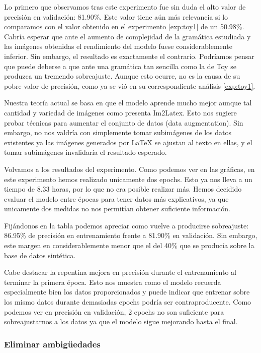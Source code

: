 \documentclass[a4paper, 20pt, dvipsnames]{article}
\begin{document}
Lo primero que observamos tras este experimento fue sin duda el alto valor de precisión
en validación: 81.90\%. Este valor tiene aún más relevancia si lo comparamos con el valor
obtenido en el experimento \ref{exp:toy1} de un 50.98\%. Cabría esperar que ante el aumento
de complejidad de la gramática estudiada y las imágenes obtenidas el rendimiento del
modelo fuese considerablemente inferior. Sin embargo, el resultado es exactamente el
contrario. Podríamos pensar que puede deberse a que ante una gramática tan sencilla
como la de Toy se produzca un tremendo sobreajuste. Aunque esto ocurre, no es la causa
de su pobre valor de precisión, como ya se vió en su correspondiente análisis \ref{exp:toy1}.

Nuestra teoría actual se basa en que el modelo aprende mucho mejor aunque tal cantidad
y variedad de imágenes como presenta Im2Latex. Esto nos sugiere probar técnicas para
aumentar el conjunto de datos (data augmentation). Sin embargo, no nos valdría con
simplemente tomar subimágenes de los datos existentes ya las imágenes generados por
\LaTeX{} se ajustan al texto en ellas, y el tomar subimágenes invalidaría el resultado
esperado.

Volvamos a los resultados del experimento. Como podemos ver en las gráficas, en este
experimento hemos realizado unicamente dos epochs. Esto ya nos lleva a un tiempo de
8.33 horas, por lo que no era posible realizar más. Hemos decidido evaluar el modelo
entre épocas para tener datos más explicativos, ya que unicamente dos medidas no nos
permitían obtener suficiente información.

Fijándonos en la tabla podemos apreciar como vuelve a producirse sobreajuste: 86.95\%
de precisión en entrenamiento frente a 81.90\% en validación. Sin embargo, este margen
en considerablemente menor que el del 40\% que se producía sobre la base de datos sintética.

Cabe destacar la repentina mejora en precisión durante el entrenamiento al terminar
la primera época. Esto nos muestra como el modelo recuerda especialmente bien los
datos proporcionados y puede indicar que entrenar sobre los mismo datos durante
demasiadas epochs podría ser contraproducente. Como podemos ver en precisión en
validación, 2 epochs no son suficiente para sobreajustarnos a los datos ya que el
modelo sigue mejorando hasta el final.

\subsubsection{Eliminar ambigüedades}
\label{exp:2}
\end{document}
